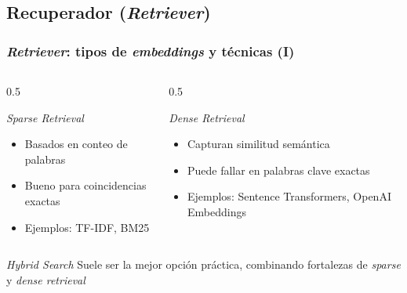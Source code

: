 \documentclass[handout]{beamer}
\begin{document}
\subsection{Recuperador (\textit{Retriever})}
\begin{frame}
  \frametitle{\textit{Retriever}: tipos de \textit{embeddings} y técnicas (I)}
  \begin{columns}[T]
    \begin{column}{0.5\textwidth}
      \begin{block}{\textit{Sparse Retrieval}}
        \begin{itemize}
            \item Basados en conteo de palabras
            \item Bueno para coincidencias exactas
            \item Ejemplos: TF-IDF, BM25
          \end{itemize}
      \end{block}
    \end{column}
    \begin{column}{0.5\textwidth}
      \begin{block}{\textit{Dense Retrieval}}
        \begin{itemize}
            \item Capturan similitud semántica
            \item Puede fallar en palabras clave exactas
            \item Ejemplos: Sentence Transformers, OpenAI Embeddings
        \end{itemize}
      \end{block}
    \end{column}
  \end{columns}
  \begin{block}{\textit{Hybrid Search}}
    Suele ser la mejor opción práctica, combinando fortalezas de \textit{sparse} y \textit{dense retrieval}
  \end{block}
\end{frame}
\end{document}

